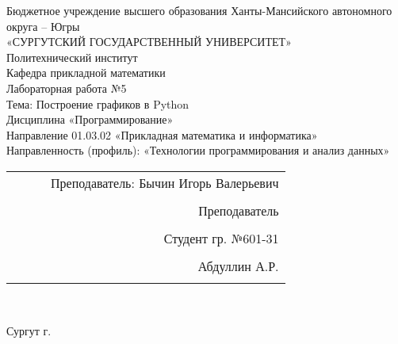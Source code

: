 \documentclass[a4paper]{article}
\begin{document}
\thispagestyle{empty}
\begin{center}

\large{Бюджетное учреждение высшего образования Ханты-Мансийского автономного округа – Югры}\\
\large{«СУРГУТСКИЙ ГОСУДАРСТВЕННЫЙ УНИВЕРСИТЕТ»}\\

\hfill \break
\normalsize{Политехнический институт}\\
 \hfill \break
\normalsize{Кафедра прикладной математики}\\
\hfill\break
\hfill \break
\hfill \break
\hfill \break
\large{Лабораторная работа №5}\\
\normalsize{Тема: Построение графиков в Python}\\
\hfill \break
\hfill \break
\hfill \break
\hfill \break
Дисциплина «Программирование»\\
\hfill \break
\small{Направление 01.03.02 «Прикладная математика и информатика»\\
Направленность (профиль): «Технологии программирования и анализ данных»}\\
\end{center}

\hfill \break
\hfill \break
\hfill \break
\hfill \break
\hfill \break
\hfill \break

\begin{flushright}
\normalsize{ 
\begin{tabular}{ccrr}
 & & & Преподаватель: Бычин Игорь Валерьевич \\\\
 & & & Преподаватель \\\\
 & & & Студент гр. №601-31 \\\\
 & & & Абдуллин А.Р. \\\\
\end{tabular}
}\\
\end{flushright}

\hfill \break
\hfill \break
\begin{center} Сургут \the\year{} г.  \end{center}
\end{document}
